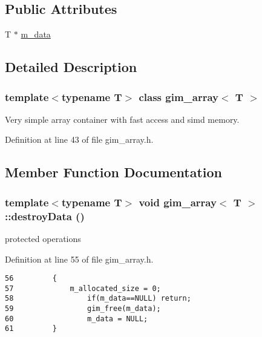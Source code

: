 \subsection*{Public Attributes}
\begin{Indent}{\bf }\par
\begin{CompactItemize}
\item 
T $\ast$ \hyperlink{classgim__array_afb886b0fb48bed8c878d8a82dc4099c}{m\_\-data}
\end{CompactItemize}
\end{Indent}


\subsection{Detailed Description}
\subsubsection*{template$<$typename T$>$ class gim\_\-array$<$ T $>$}

Very simple array container with fast access and simd memory. 

Definition at line 43 of file gim\_\-array.h.

\subsection{Member Function Documentation}
\hypertarget{classgim__array_a7a9dca42674415635846cd077cb4a97}{
\subsubsection[destroyData]{\setlength{\rightskip}{0pt plus 5cm}template$<$typename T$>$ void {\bf gim\_\-array}$<$ T $>$::destroyData ()}}
\label{classgim__array_a7a9dca42674415635846cd077cb4a97}


protected operations 

Definition at line 55 of file gim\_\-array.h.

\begin{Code}\begin{verbatim}56         {
57             m_allocated_size = 0;
58                 if(m_data==NULL) return;
59                 gim_free(m_data);
60                 m_data = NULL;
61         }
\end{verbatim}
\end{Code}


